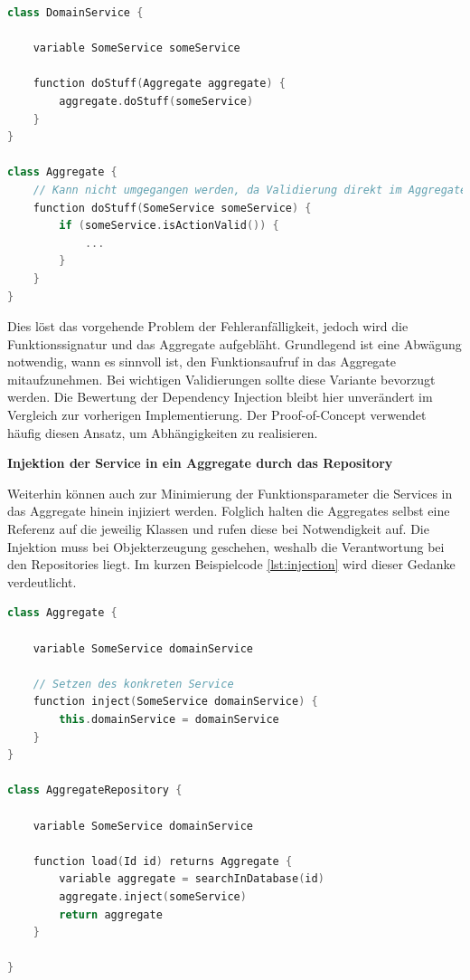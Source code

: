 \begin{minipage}{\linewidth} %
	\begin{lstlisting}[caption={Übergabe der Referenz an das Aggregate als Parameter}, label={lst:parameter}, language=Kotlin]
class DomainService {
	
	variable SomeService someService
	
	function doStuff(Aggregate aggregate) {
		aggregate.doStuff(someService)
	}
}

class Aggregate {
	// Kann nicht umgegangen werden, da Validierung direkt im Aggregate geschieht
	function doStuff(SomeService someService) {
		if (someService.isActionValid()) {
			...
		}
	}
}
	\end{lstlisting}
\end{minipage}

Dies löst das vorgehende Problem der Fehleranfälligkeit, jedoch wird die Funktionssignatur und das Aggregate aufgebläht. Grundlegend ist eine Abwägung notwendig, wann es sinnvoll ist, den Funktionsaufruf in das Aggregate mitaufzunehmen. Bei wichtigen Validierungen sollte diese Variante bevorzugt werden. Die Bewertung der Dependency Injection bleibt hier unverändert im Vergleich zur vorherigen Implementierung. Der Proof-of-Concept verwendet häufig diesen Ansatz, um Abhängigkeiten zu realisieren.

\textbf{Injektion der Service in ein Aggregate durch das Repository}

Weiterhin können auch zur Minimierung der Funktionsparameter die Services in das Aggregate hinein injiziert werden. Folglich halten die Aggregates selbst eine Referenz auf die jeweilig Klassen und rufen diese bei Notwendigkeit auf. Die Injektion muss bei Objekterzeugung geschehen, weshalb die Verantwortung bei den Repositories liegt. Im kurzen Beispielcode \ref{lst:injection} wird dieser Gedanke verdeutlicht.

\begin{minipage}{\linewidth} %
	\begin{lstlisting}[caption={Injektion des Services in ein Aggregate durch das Repository}, label={lst:injection}, language=Kotlin]
class Aggregate {
	
	variable SomeService domainService
	
	// Setzen des konkreten Service
	function inject(SomeService domainService) {
		this.domainService = domainService
	}
}

class AggregateRepository {
	
	variable SomeService domainService
	
	function load(Id id) returns Aggregate {
		variable aggregate = searchInDatabase(id)
		aggregate.inject(someService)
		return aggregate
	}
	
}
	\end{lstlisting}
\end{minipage}

